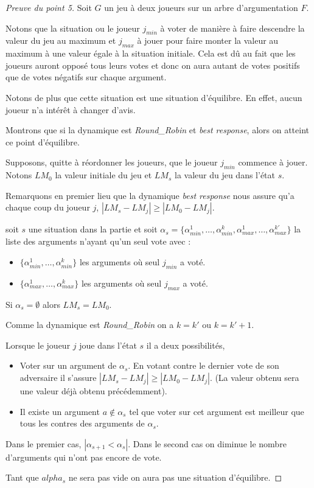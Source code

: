 \documentclass[11pt]{article}
\theoremstyle{defi}
\theoremstyle{not}
\theoremstyle{prob}
\begin{document}
        \begin{proof}[Preuve du point 5]
          Soit $G$ un jeu à deux joueurs sur un arbre d'argumentation $F$.

          Notons que la situation ou le joueur $j_{min}$ à voter de manière à faire descendre la valeur du jeu au maximum et $j_{max}$ à jouer pour faire monter la valeur au maximum à une valeur égale à la situation initiale.
          Cela est dû au fait que les joueurs auront opposé tous leurs votes et donc on aura autant de votes positifs que de votes négatifs sur chaque argument.

          Notons de plus que cette situation est une situation d'équilibre. En effet, aucun joueur n'a intérêt à changer d'avis.

          Montrons que si la dynamique est \emph{Round\_Robin} et \emph{best response}, alors on atteint ce point d'équilibre.

          Supposons, quitte à réordonner les joueurs, que le joueur $j_{min}$ commence à jouer. Notons $LM_0$ la valeur initiale du jeu et $LM_s$ la valeur du jeu dans l'état $s$.

          Remarquons en premier lieu que la dynamique \emph{best response} nous assure qu'a chaque coup du joueur $j$, $|LM_s - LM_j| \geq |LM_0 - LM_j|$.

          soit $s$ une situation dans la partie et soit $\alpha_s = \{\alpha_{min}^1, \ldots, \alpha_{min}^k, \alpha_{max}^1, \ldots, \alpha_{max}^{k'}\}$ la liste des arguments n'ayant qu'un seul vote avec :
          \begin{itemize}
            \item $\{\alpha_{min}^1, \ldots, \alpha_{min}^k\}$ les arguments où seul $j_{min}$ a voté.
            \item $\{\alpha_{max}^1, \ldots, \alpha_{max}^k\}$ les arguments où seul $j_{max}$ a voté.
          \end{itemize}

          Si $\alpha_s = \emptyset$ alors $LM_s = LM_0$.

          Comme la dynamique est \emph{Round\_Robin} on a $k = k'$ ou $k = k' + 1$.

          Lorsque le joueur $j$ joue dans l'état $s$ il a deux possibilités,
          \begin{itemize}
            \item Voter sur un argument de $\alpha_s$. En votant contre le dernier vote de son adversaire il s'assure $|LM_s - LM_j| \geq |LM_0 - LM_j|$. (La valeur obtenu sera une valeur déjà obtenu précédemment).
            \item Il existe un argument $a \not \in \alpha_s$ tel que voter sur cet argument est meilleur que tous les contres des arguments de $\alpha_s$.
          \end{itemize}

          Dans le premier cas, $|\alpha_{s+1} < \alpha_s|$. Dans le second cas on diminue le nombre d'arguments qui n'ont pas encore de vote.

          Tant que $alpha_s$ ne sera pas vide on aura pas une situation d'équilibre.
        \end{proof}
\end{document}
